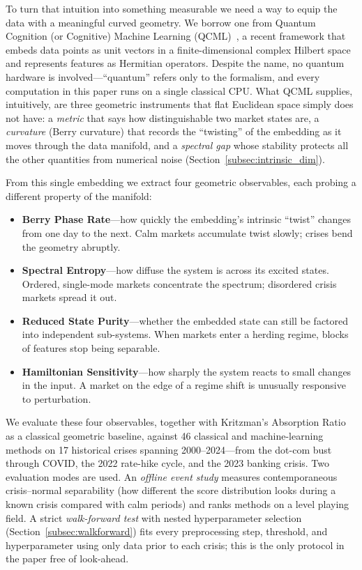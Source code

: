 \documentclass[3p]{elsarticle}
\begin{document}
To turn that intuition into something measurable we need a way to
equip the data with a meaningful curved geometry.  We borrow one
from Quantum Cognition (or Cognitive) Machine Learning
(QCML)~\cite{candelori2025,abanov2025}, a recent framework that
embeds data points as unit vectors in a finite-dimensional complex
Hilbert space and represents features as Hermitian operators.
Despite the name, no quantum hardware is involved---``quantum''
refers only to the formalism, and every computation in this paper
runs on a single classical CPU.  What QCML supplies, intuitively,
are three geometric instruments that flat Euclidean space simply
does not have: a \emph{metric} that says how distinguishable two
market states are, a \emph{curvature} (Berry curvature) that records
the ``twisting'' of the embedding as it moves through the data
manifold, and a \emph{spectral gap} whose stability protects all
the other quantities from numerical noise
(Section~\ref{subsec:intrinsic_dim}).

From this single embedding we extract four geometric observables,
each probing a different property of the manifold:
\begin{itemize}
\item \textbf{Berry Phase Rate}---how quickly the embedding's
  intrinsic ``twist'' changes from one day to the next.  Calm
  markets accumulate twist slowly; crises bend the geometry
  abruptly.
\item \textbf{Spectral Entropy}---how diffuse the system is across
  its excited states.  Ordered, single-mode markets concentrate the
  spectrum; disordered crisis markets spread it out.
\item \textbf{Reduced State Purity}---whether the embedded state
  can still be factored into independent sub-systems.  When markets
  enter a herding regime, blocks of features stop being separable.
\item \textbf{Hamiltonian Sensitivity}---how sharply the system
  reacts to small changes in the input.  A market on the edge of a
  regime shift is unusually responsive to perturbation.
\end{itemize}

We evaluate these four observables, together with Kritzman's
Absorption Ratio~\cite{kritzman2011} as a classical geometric
baseline, against 46 classical and machine-learning methods on 17
historical crises spanning 2000--2024---from the dot-com bust
through COVID, the 2022 rate-hike cycle, and the 2023 banking
crisis.  Two evaluation modes are used.  An \emph{offline event
study} measures contemporaneous crisis--normal separability (how
different the score distribution looks during a known crisis
compared with calm periods) and ranks methods on a level playing
field.  A strict \emph{walk-forward test} with nested hyperparameter
selection (Section~\ref{subsec:walkforward}) fits every
preprocessing step, threshold, and hyperparameter using only data
prior to each crisis; this is the only protocol in the paper free
of look-ahead.
\end{document}
